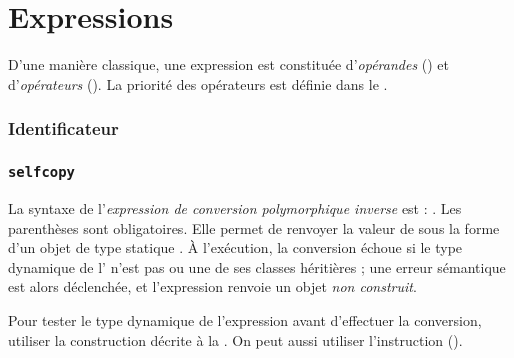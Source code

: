 
\chapter{Expressions}

D'une manière classique, une expression est constituée d'\emph{opérandes} () et d'\emph{opérateurs} (). La priorité des opérateurs est définie dans le .





\subsection{Identificateur}

\subsection{\texttt{selfcopy}}



La syntaxe de l'\emph{expression de conversion polymorphique inverse} est : . Les parenthèses sont obligatoires. Elle permet de renvoyer la valeur de  sous la forme d'un objet de type statique . À l'exécution, la conversion échoue si le type dynamique de l' n'est pas  ou une de ses classes héritières ; une erreur sémantique est alors déclenchée, et l'expression renvoie un objet \emph{non construit}.

Pour tester le type dynamique de l'expression avant d'effectuer la conversion, utiliser la construction décrite à la . On peut aussi utiliser l'instruction  ().







